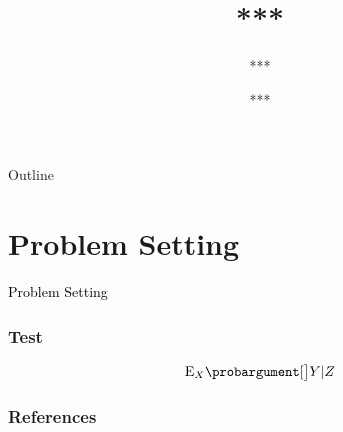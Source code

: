 \documentclass[10pt,xcolor={dvipsnames}]{beamer}
\title{***}
\date{***}
\author{***}
\begin{document}
%
{%
  \begin{frame}[noframenumbering]
    \titlepage
  \end{frame}
}
%
\begin{frame}{Outline}
  \tableofcontents
\end{frame}
%
\section{Problem Setting}
%
\begin{frame}[noframenumbering]
  \begin{center}
  { \Huge \textcolor{black}{Problem Setting} }
  \end{center}
\end{frame}
%
\begin{frame}
  \frametitle{Test}
  \begin{gather}
    \expect_{X}[\big]{Y|Z}
  \end{gather}
\end{frame}


\begin{frame}[t,allowframebreaks]
  \frametitle{References}
  
  
\end{frame}

\end{document}
